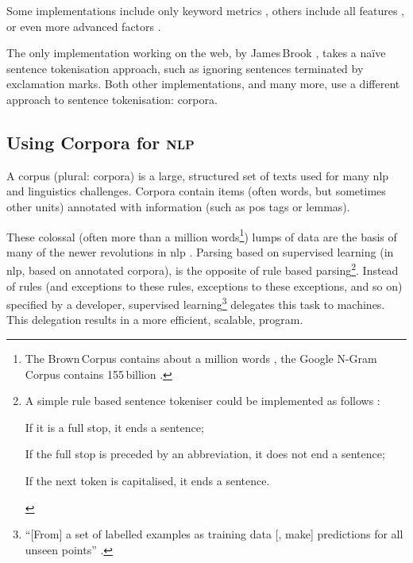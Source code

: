 \noindent Some implementations include only keyword metrics
  \autocite{jbrooksuk/node-summary-source-code}, others include all features
  \autocite{MojoJolo/textteaser-source-code}, or even more advanced factors
  \autocite{summly}.

The only implementation working on the web, by James\,Brook
  \autocite*{jbrooksuk/node-summary-source-code}, takes a na\"ive sentence
  tokenisation approach, such as ignoring sentences terminated by
  exclamation marks.
Both other implementations, and many more, use a different approach to
  sentence tokenisation: corpora.

\subsection{Using Corpora for \textsc{nlp}}\label{using-corpora-for}

A corpus (plural: corpora) is a large, structured set of texts used for many
  \gls{nlp} and linguistics challenges.
Corpora contain items (often words, but sometimes other units) annotated
  with information (such as \gls{pos} tags or lemmas).

These colossal (often more than a million words\footnote{The Brown\,Corpus
    contains about a million words \autocite{francis-nelson-brown-corpus},
    the Google N-Gram\,Corpus contains 155\,billion
    \autocite{brants-thorsten-google-ngram-corpus}.})
  lumps of data are the basis of many of the newer revolutions in \gls{nlp}
  \autocite{mitkov-ruslan-ea-importance-corpora}.
Parsing based on supervised learning (in \gls{nlp}, based on annotated
  corpora), is the opposite of rule based parsing\footnote{A simple
    rule based sentence tokeniser could be implemented as follows
    \autocite{attivio.com-doing-things-with-sentences}:

    \begin{aenumerate}
      \item If it is a full stop, it ends a sentence;
      \item If the full stop is preceded by an abbreviation, it does not end
        a sentence;
      \item If the next token is capitalised, it ends a sentence.
    \end{aenumerate}}.
Instead of rules (and exceptions to these rules, exceptions to these
  exceptions, and so on) specified by a developer,
  supervised learning\footnote{``{[}From{]} a set of labelled examples as
    training data {[}, make{]} predictions for all unseen points''
    \autocite{mohri-mehryar-foundations-machine-learning}.}
  delegates this task to machines.
This delegation results in a more efficient, scalable, program.

